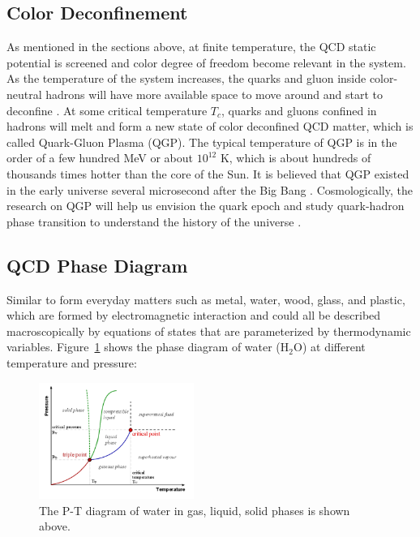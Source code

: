 \subsection{Color Deconfinement}

As mentioned in the sections above, at finite temperature, the QCD static potential is screened and color degree of freedom become relevant in the system. As the temperature of the system increases, the quarks and gluon inside color-neutral hadrons will have more available space to move around and start to deconfine \cite{DeconfineTemp}. At some critical temperature $T_c$, quarks and gluons confined in hadrons will melt and form a new state of color deconfined QCD matter, which is called Quark-Gluon Plasma (QGP). The typical temperature of QGP is in the order of a few hundred MeV or about $10^{12}$ K, which is about hundreds of thousands times hotter than the core of the Sun. It is believed that QGP existed in the early universe several microsecond after the Big Bang \cite{QGPUniverse}. Cosmologically, the research on QGP will help us envision the quark epoch and study quark-hadron phase transition to understand the history of the universe \cite{QHPhase}. 



\subsection{QCD Phase Diagram}

Similar to form everyday matters such as metal, water, wood, glass, and plastic, which are formed by electromagnetic interaction and could all be described macroscopically by equations of states that are parameterized by thermodynamic variables. 
\iffalse Figure~\ref{QEDPhaseDiagram} shows the phase diagram of water ($\mathrm{H_2O}$) at different temperature and pressure:

\begin{figure}[hbtp]
\begin{center}
\includegraphics[width=0.45\textwidth]{Figures/Chapter1/WaterPhaseDiagram.png}
\caption{The P-T diagram of water in gas, liquid, solid phases is shown above.}
\label{QEDPhaseDiagram}
\end{center}
\end{figure} 

